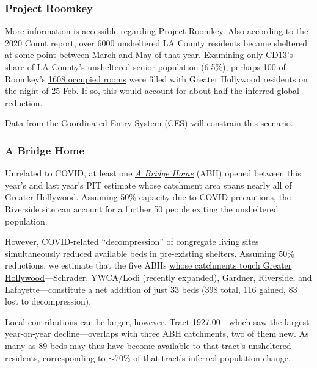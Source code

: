 \documentclass[11pt,twocolumn]{article}
\begin{document}
\subsubsection{Project Roomkey}

More information is accessible regarding Project Roomkey. Also according to the 2020 Count report, 
over 6000 unsheltered LA County residents became sheltered at some point between March and May of that year.
Examining only \href{https://www.lahsa.org/documents?id=4672-2020-homeless-count-council-district-13}
{CD13's} share of \href{https://www.lahsa.org/documents?id=4585-2020-greater-los-angeles-homeless-count-los-angeles-continuum-of-care-coc-}{LA County's unsheltered senior population} (6.5\%), perhaps 100 of Roomkey's 
\href{https://projectroomkeytracker.com/}{1608 occupied rooms} were filled with Greater Hollywood residents 
on the night of 25 Feb. If so, this would account for about half the inferred global reduction. 

Data from the Coordinated Entry System (CES) will constrain this scenario.

\subsubsection{A Bridge Home}

Unrelated to COVID, at least one \href{https://www.lamayor.org/ABridgeHome}{\it A Bridge Home} (ABH) 
opened between this year's and last year's PIT estimate whose catchment area spans nearly all of Greater 
Hollywood. Assuming 50\% capacity due to COVID precautions, the Riverside site can account for a further 
50 people exiting the unsheltered population.

However, COVID-related ``decompression'' of congregate living sites simultaneously reduced available beds in 
pre-existing shelters. Assuming 50\% reductions, we estimate that the five ABHs \href{https://arcg.is/0fy81}
{whose catchments touch Greater Hollywood}---Schrader, YWCA/Lodi (recently expanded), Gardner, Riverside, and 
Lafayette---constitute a net addition of just 33 beds (398 total, 116 gained, 83 lost to decompression). 

Local contributions can be larger, however. Tract 1927.00---which saw the largest year-on-year 
decline---overlaps with three ABH catchments, two of them new. As many as 89 beds may thus have become
available to that tract's unsheltered residents, corresponding to $\sim$70\% of that tract's inferred population change.
\end{document}
